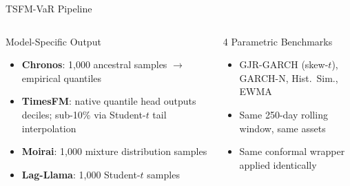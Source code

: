 \documentclass[9pt, aspectratio=169, t]{beamer}
\begin{document}
\begin{frame}{TSFM-VaR Pipeline}
\begin{columns}[T]
		{\small
			\begin{block}{Model-Specific Output}
				\begin{itemize}\setlength{\itemsep}{2pt}
					\item \textbf{Chronos}: 1{,}000 ancestral samples $\to$ empirical quantiles
					\item \textbf{TimesFM}: native quantile head outputs deciles; sub-10\% via Student-$t$ tail interpolation
					\item \textbf{Moirai}: 1{,}000 mixture distribution samples
					\item \textbf{Lag-Llama}: 1{,}000 Student-$t$ samples
				\end{itemize}
			\end{block}
			\vspace{1mm}
			\begin{block}{4 Parametric Benchmarks}
				\begin{itemize}\setlength{\itemsep}{1pt}
					\item GJR-GARCH (skew-$t$), GARCH-N, Hist.\ Sim., EWMA
					\item Same 250-day rolling window, same assets
					\item Same conformal wrapper applied identically
				\end{itemize}
			\end{block}
		}
	\end{columns}
\end{frame}
\end{document}
